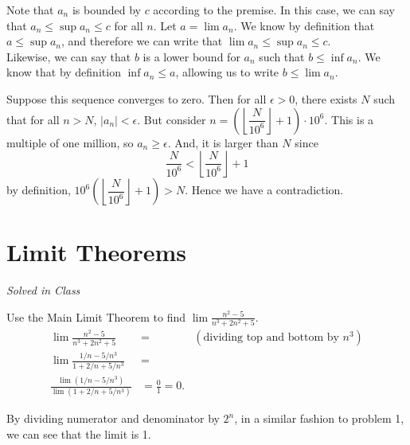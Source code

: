 \documentclass[12pt]{book}
\newenvironment{exercise}[2][Exercise]{\begin{trivlist}
\item[\hskip \labelsep {\bfseries #1}\hskip \labelsep {\bfseries #2.}]}{\end{trivlist}}
\begin{document}
\begin{exercise}{1.4.6}
\begin{exercise}{2.2.12}
Note that ${a_n}$ is bounded by $c$ according to the premise. In this case, we can say that $a_n \leq \sup a_n \leq c$ for all $n$. Let $ a = \lim a_n$. We know by definition that $a \leq \sup a_n$, and therefore we can write that $\lim a_n \leq \sup a_n \leq c$. \\
Likewise, we can say that $b$ is a lower bound for $a_n$ such that $b \leq \inf a_n$. We know that by definition $\inf a_n \leq a$, allowing us to write $b \leq \lim a_n$.
\end{exercise}

\begin{exercise}{2.2.15} 
Suppose this sequence converges to zero. Then for all $\epsilon > 0$, there exists $N$ such that for all $n > N$, $|a_n| < \epsilon.$ But consider $n = \displaystyle \left(\left \lfloor \dfrac{N}{10^6} \right \rfloor + 1\right ) \cdot 10^6.$ This is a multiple of one million, so $a_n \geq \epsilon.$ And, it is larger than $N$ since $$\dfrac{N}{10^6} < \left \lfloor \dfrac{N}{10^6} \right \rfloor+1$$ by definition, $10^6 \left(\left \lfloor \dfrac{N}{10^6} \right \rfloor + 1\right) > N.$ Hence we have a contradiction. 
\end{exercise}



\section{Limit Theorems}

\begin{exercise}{2.3.1}
\emph{Solved in Class}
\end{exercise}


\begin{exercise}{2.3.2}
Use the Main Limit Theorem to find $\lim \frac{n^2 - 5}{n^3 + 2n^2 + 5}$. \\
	\begin{align*}
		\lim \frac{n^2 - 5}{n^3 + 2n^2 + 5} &=  &(\text{dividing top and bottom by $n^3$}) \\
		\lim \frac{1/n - 5/n^3}{1+2/n + 5/n^3} &= \\
		\frac{\lim (1/n - 5/n^3)}{\lim (1+2/n + 5/n^3)} &= \frac{0}{1} = 0.
	\end{align*}
\end{exercise}

\begin{exercise}{2.3.3}
By dividing numerator and denominator by $2^n$, in a similar fashion to problem 1, we can see that the limit is 1. 




\end{exercise}
\end{exercise}
\end{document}
